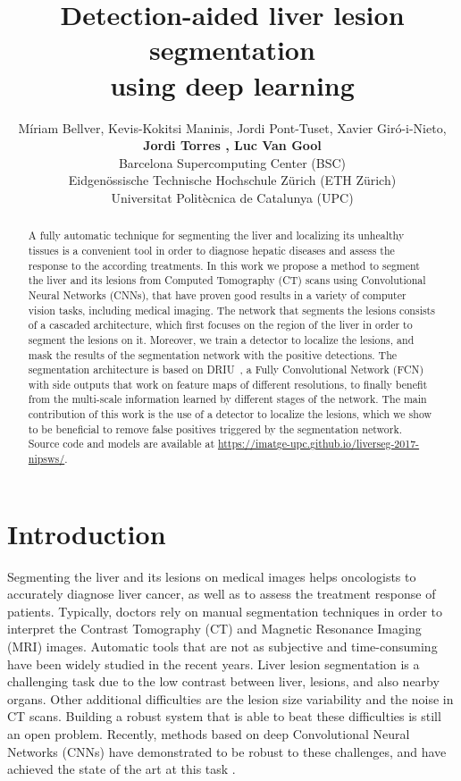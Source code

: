 \documentclass{article}
\title{Detection-aided liver lesion segmentation \\using deep learning}
\author{
 M\'{i}riam Bellver\raisebox{5pt}{\small \dag}, Kevis-Kokitsi Maninis\raisebox{5pt}{\small \ddag}, Jordi Pont-Tuset\raisebox{5pt}{\small \ddag}, Xavier Gir{\'o}-i-Nieto\raisebox{5pt}{\small \S}, \\
  \textbf{Jordi Torres \raisebox{5pt}{\small \dag,\S}, Luc Van Gool \raisebox{5pt}{\small \ddag} }\\
  \raisebox{5pt}{\small \dag}Barcelona Supercomputing Center (BSC) \\
  \raisebox{5pt}{\small \ddag} Eidgen\"{o}ssische Technische Hochschule Z\"{u}rich (ETH Z\"{u}rich) \\
  \raisebox{5pt}{\small \S}Universitat Polit{\`e}cnica de Catalunya (UPC) \\
}
\begin{document}
\maketitle

\begin{abstract}
  A fully automatic technique for segmenting the liver and localizing its unhealthy tissues is a convenient tool in order to diagnose hepatic diseases and assess the response to the according treatments. In this work we propose a method to segment the liver and its lesions from Computed Tomography (CT) scans using Convolutional Neural Networks (CNNs), that have proven good results in a variety of computer vision tasks, including medical imaging. The network that segments the lesions consists of a cascaded architecture, which first focuses on the region of the liver in order to segment the lesions on it. Moreover, we train a detector to localize the lesions, and mask the results of the segmentation network with the positive detections. The segmentation architecture is based on DRIU~\cite{maninis2016deep}, a Fully Convolutional Network (FCN) with side outputs that work on feature maps of different resolutions, to finally  benefit from the multi-scale information learned by different stages of the network. The main contribution of this work is the use of a detector to localize the lesions, which we show to be beneficial to remove false positives triggered by the segmentation network. Source code and models are available
at \url{https://imatge-upc.github.io/liverseg-2017-nipsws/}.
\end{abstract}

\section{Introduction}

Segmenting the liver and its lesions on medical images helps oncologists to accurately diagnose liver cancer, as well as to assess the treatment response of patients. Typically, doctors rely on manual segmentation techniques in order to interpret the Contrast Tomography (CT) and Magnetic Resonance Imaging (MRI) images. Automatic tools that are not as subjective and time-consuming have been widely studied in the recent years. Liver lesion segmentation is a challenging task due to the low contrast between liver, lesions, and also nearby organs. Other additional difficulties are the lesion size variability and the noise in CT scans. Building a robust system that is able to beat these difficulties is still an open problem. Recently, methods based on deep Convolutional Neural Networks (CNNs) have demonstrated to be robust to these challenges, and have achieved the state of the art at this task \cite{christ2017automatic, han2017automatic, bi2017automatic}. 
\end{document}
